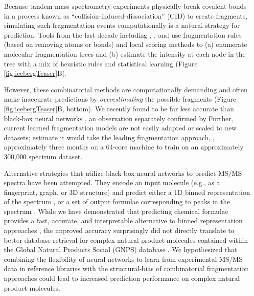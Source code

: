 \documentclass[journal=jcim,manuscript=article]{achemso}
\begin{document}
Because tandem mass spectrometry experiments physically break covalent bonds in a process known as ``collision-induced-dissociation'' (CID) to create fragments, simulating such fragmentation events computationally is a natural strategy for prediction. Tools from the last decade including \metfrag \cite{wolf_silico_2010}, \MAGMA \cite{ridder_automatic_2014}, and \cfmModel \cite{allen_competitive_2015, wang_cfm-id_2021} use fragmentation rules (based on removing atoms or bonds) and local scoring methods to (a) enumerate molecular fragmentation trees and (b) estimate the intensity at each node in the tree with a mix of heuristic rules and statistical learning (Figure \ref{fig:icebergTeaser}B). 




However, these combinatorial methods are computationally demanding and often make inaccurate predictions by \emph{overestimating} the possible fragments (Figure \ref{fig:icebergTeaser}B, bottom). 
We recently found \cfmModel to be far less accurate than black-box neural networks \cite{goldman_prefix-tree_2023}, an observation separately confirmed by \citeauthor{murphy2023efficiently} \cite{murphy2023efficiently} Further, current learned fragmentation models are not easily adapted or scaled to new datasets; \citeauthor{murphy2023efficiently} estimate it would take the leading fragmentation approach, \cfmModel \cite{allen_competitive_2015}, approximately three months on a 64-core machine to train on an approximately 300,000 spectrum dataset.


Alternative strategies that utilize black box neural networks to predict MS/MS spectra have been attempted. They encode an input molecule (e.g., as a fingerprint, graph, or 3D structure) and predict either a 1D binned representation of the spectrum \cite{wei_rapid_2019,
zhu_using_2020, young_Massformer_2021, hong20233DMolMS}, or a set of output formulae corresponding to peaks in the spectrum \cite{goldman_prefix-tree_2023, zhu2023rapid, murphy2023efficiently}. While we have demonstrated that predicting chemical formulae provides a fast, accurate, and interpretable alternative to binned representation approaches \cite{goldman_prefix-tree_2023}, the improved accuracy surprisingly did not directly translate to better database retrieval for complex natural product molecules contained within the Global Natural Products Social (GNPS) database  \cite{wang_sharing_2016}. We hypothesized that combining the flexibility of neural networks to learn from experimental MS/MS data in reference libraries with the structural-bias of combinatorial fragmentation approaches could lead to increased prediction performance on complex natural product molecules.
\end{document}
